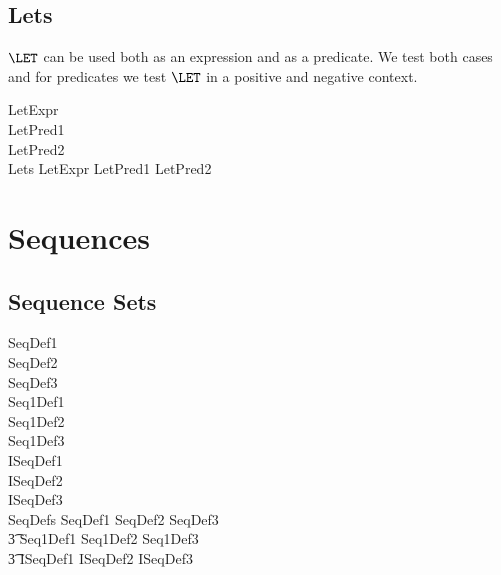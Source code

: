 \documentclass{article}
\begin{document}
\subsection{Lets}
$\LET$ can be used both as an expression and as a predicate. We test both cases and
for predicates we test $\LET$ in a positive and negative context.
\begin{zed}
  LetExpr \\
  LetPred1 \\
  LetPred2 \\
  \also
  Lets  LetExpr \land LetPred1 \land LetPred2\\
\end{zed}

\section{Sequences}
\subsection{Sequence Sets}
\begin{zed}
  SeqDef1 \\
  SeqDef2 \\
  SeqDef3 \\
  Seq1Def1 \\
  Seq1Def2 \\
  Seq1Def3 \\
  ISeqDef1 \\
  ISeqDef2 \\
  ISeqDef3 \\
  \also
  SeqDefs  SeqDef1 \land SeqDef2 \land SeqDef3 \land\\
  \t3 Seq1Def1 \land Seq1Def2 \land Seq1Def3 \land\\
  \t3 ISeqDef1 \land ISeqDef2 \land ISeqDef3
\end{zed}
\end{document}
